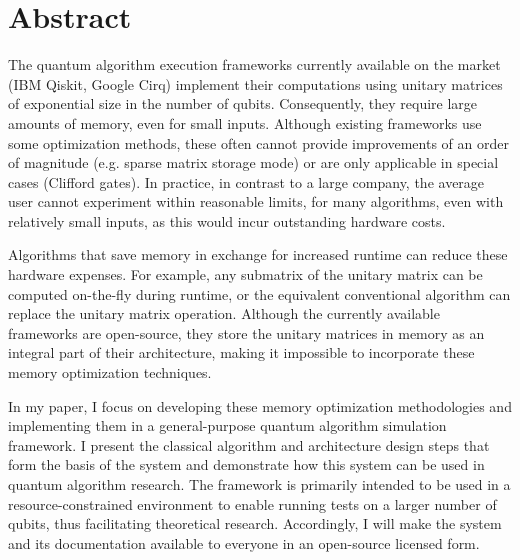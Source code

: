 \vfill
\selectenglish


\chapter*{Abstract}

The quantum algorithm execution frameworks currently available on the market (IBM Qiskit, Google Cirq) implement their computations using unitary matrices of exponential size in the number of qubits. Consequently, they require large amounts of memory, even for small inputs. Although existing frameworks use some optimization methods, these often cannot provide improvements of an order of magnitude (e.g. sparse matrix storage mode) or are only applicable in special cases (Clifford gates). In practice, in contrast to a large company, the average user cannot experiment within reasonable limits, for many algorithms, even with relatively small inputs, as this would incur outstanding hardware costs.

Algorithms that save memory in exchange for increased runtime can reduce these hardware expenses. For example, any submatrix of the unitary matrix can be computed on-the-fly during runtime, or the equivalent conventional algorithm can replace the unitary matrix operation. Although the currently available frameworks are open-source, they store the unitary matrices in memory as an integral part of their architecture, making it impossible to incorporate these memory optimization techniques.

In my paper, I focus on developing these memory optimization methodologies and implementing them in a general-purpose quantum algorithm simulation framework. I present the classical algorithm and architecture design steps that form the basis of the system and demonstrate how this system can be used in quantum algorithm research. The framework is primarily intended to be used in a resource-constrained environment to enable running tests on a larger number of qubits, thus facilitating theoretical research. Accordingly, I will make the system and its documentation available to everyone in an open-source licensed form.

\vfill
\selectthesislanguage

\setcounter{romanPage}{\value{page}}
